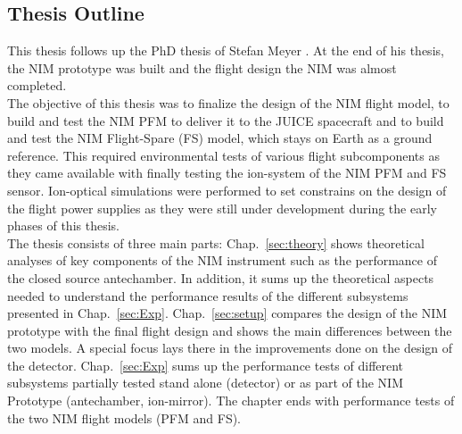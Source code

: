 	\subsection{Thesis Outline}
	This thesis follows up the PhD thesis of Stefan Meyer \cite{Diss_Meyer}. At the end of his thesis, the NIM prototype was built and the flight design the NIM was almost completed.\\	
	The objective of this thesis was to finalize the design of the NIM flight model, to build and test the NIM PFM to deliver it to the JUICE spacecraft and to build and test the NIM Flight-Spare (FS) model, which stays on Earth as a ground reference. This required environmental tests of various flight subcomponents as they came available with finally testing the ion-system of the NIM PFM and FS sensor. Ion-optical simulations were performed to set constrains on the design of the flight power supplies as they were still under development during the early phases of this thesis.\\
	The thesis consists of three main parts: Chap.~\ref{sec:theory} shows theoretical analyses of key components of the NIM instrument such as the performance of the closed source antechamber. In addition, it sums up the theoretical aspects needed to understand the performance results of the different subsystems presented in Chap.~\ref{sec:Exp}. Chap.~\ref{sec:setup} compares the design of the NIM prototype with the final flight design and shows the main differences between the two models. A special focus lays there in the improvements done on the design of the detector. Chap.~\ref{sec:Exp} sums up the performance tests of different subsystems partially tested stand alone (detector) or as part of the NIM Prototype (antechamber, ion-mirror). The chapter ends with performance tests of the two NIM flight models (PFM and FS).
	
